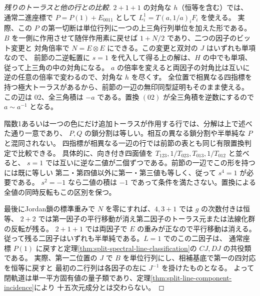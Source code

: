 \begin{proof}[残りのトーラスと他の行との比較]
$2+1+1$ の対角な $h$（恒等を含む）では、
通常二進座標で $P=P(1)+E_{0011}$ として $L_i^1=T(a,1/a)_i F_i$ を使える。
実際、この $P$ の第一切断は単位行列に一つの上三角行列単位を加えた形である。
$B$ を一側に作用させて随伴作用素に戻せば $1+N/2$ であり、二つの因子のビット変更と
対角倍率で $N=E\otimes E$ にできる。この変更と双対の $J$ はいずれも単項なので、
前節の二逆転置に $s=1$ を代入して得る上の解は、$H$ の中でも単項、従って上三角の中の対角になる。
$a$ の倍率を変えると両因子の対角比は互いに逆の任意の倍率で変わるので、対角な $h$ を尽くす。
全位置で相異なる四指標を持つ極大トーラスがあるから、前節の一辺の無印同型証明もそのまま使える。
この辺は $02$、全三角積は $-a$ である。置換 $(02)$ が全三角積を逆数にするので $a\sim a^{-1}$ となる。

階数1あるいは一つの色にだけ追加トーラスが作用する行では、分解は上で述べた通り一意であり、
$P,Q$ の鎖分割は等しい。相互の異なる鎖分割や半単純な $P$ と混同されない。
四指標が相異なる一辺の行では前節の表とも同じ有限置換判定で比較できる。
具体的に、向き付き四面値を $T_{123},1/T_{023},T_{013},1/T_{012}$ と並べると、
$s=1$ では互いに逆な二値が二個ずつである。前節の一辺でこの形を持つには既に等しい
第二・第四値以外に第一・第三値も等しく、従って $s^4=1$ が必要である。
$s^2=-1$ なら二値の積は $-1$ であって条件を満たさない。置換による全値の同時反転もこの区別を保つ。

最後にJordan鎖の標準重みで $N$ を零にすれば、$4,3+1$ では $g$ の次数付きは恒等、
$2+2$ では第一因子の平行移動が消え第二因子のトーラス元または法線化群の反転が残る。
$2+1+1$ では両因子で $E$ の重みが正なので平行移動は消える。
従って残る二因子はいずれも半単純である。$L=1$ でのこの二因子は、
通常座標 $P(1)$ に戻すと定理\ref{thm:split-spectral-line-classification}の $CJ,DJ$ の共役類である。
実際、第一二位置の $J$ で $B$ を単位行列にし、相補基底で第一の四対応を恒等に戻すと
最初の二行列は各因子の左に $J^{-1}$ を掛けたものとなる。
よって閉軌道は単一平方固有値の量子類であり、定理\ref{thm:split-line-component-incidence}により
十五次元成分とは交わらない。
\end{proof}
